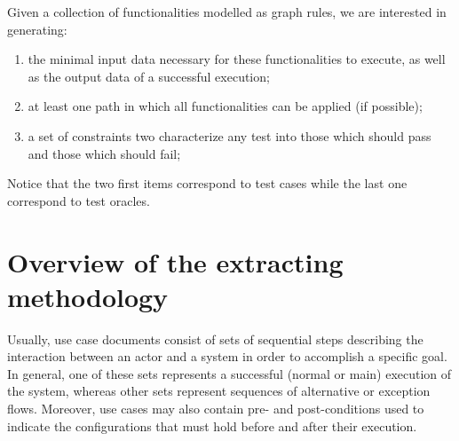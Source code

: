  Given a collection of functionalities modelled as graph rules, we are interested in generating:


\begin{enumerate}
\item the minimal input data necessary for these functionalities to execute, as well as the output data of a successful execution;
\item at least one path in which all functionalities can be applied (if possible);
\item a set of constraints two characterize any test into those which should pass and those which should fail;

\end{enumerate}

Notice that the two first items correspond to test cases while the last one correspond to test oracles.


\section{Overview of the extracting methodology}

Usually, use case documents consist of sets of sequential steps describing the interaction between an actor and a system in order to accomplish a specific goal. In general, one of these sets represents a successful (normal or main) execution of the system, whereas other sets represent sequences of alternative or exception flows. Moreover, use cases may also contain pre- and post-conditions used to indicate the configurations that must hold before and after their execution.

